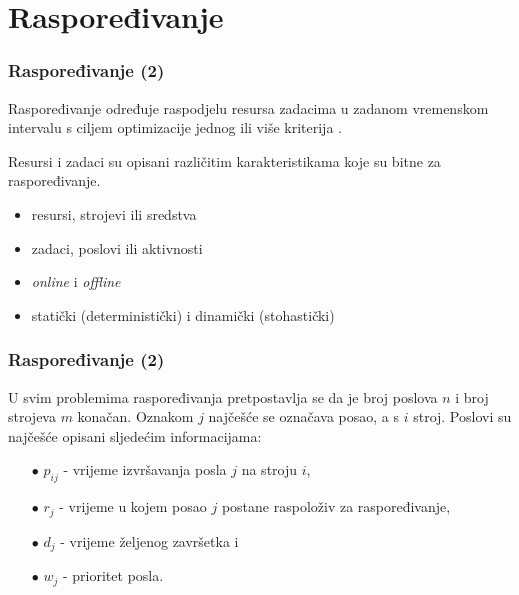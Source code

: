 \documentclass{beamer}
\begin{document}
\section{Raspoređivanje}
\begin{frame}
\frametitle{Raspoređivanje (2)}
Raspoređivanje određuje raspodjelu resursa zadacima u zadanom vremenskom
intervalu s ciljem optimizacije jednog ili više kriterija \citep{michael2018scheduling}.
\vspace{0.5cm}

Resursi i zadaci su opisani različitim karakteristikama koje su bitne za raspoređivanje.
\vspace{0.5cm}
\begin{itemize}
    \item resursi, strojevi ili sredstva
    \item zadaci, poslovi ili aktivnosti
    \item \textit{online} i \textit{offline}
    \item statički (deterministički) i dinamički (stohastički)
\end{itemize}
\end{frame}

\begin{frame}
\frametitle{Raspoređivanje (2)}
U svim problemima raspoređivanja pretpostavlja se da je
broj poslova $n$ i broj strojeva $m$ konačan. Oznakom $j$ najčešće se
označava posao, a s $i$ stroj. Poslovi su najčešće opisani sljedećim
informacijama:
\begin{itemize}
    \item[$\bullet$] $p_{ij}$ - vrijeme izvršavanja posla $j$ na stroju $i$,
    \item[$\bullet$] $r_{j}$ - vrijeme u kojem posao $j$ postane raspoloživ za raspoređivanje,
    \item[$\bullet$] $d_j$ - vrijeme željenog završetka i
    \item[$\bullet$] $w_j$ - prioritet posla.
\end{itemize}
\end{frame}
\end{document}
